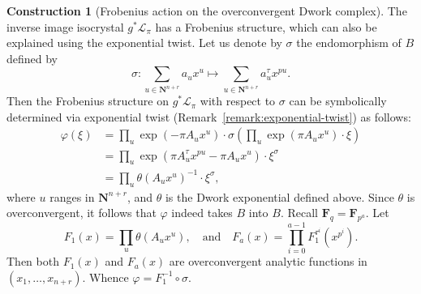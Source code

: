 \documentclass{amsart}
\numberwithin{equation}{section}
\theoremstyle{plain}
\theoremstyle{definition}
\newtheorem{construction}[equation]{Construction}
\renewcommand{\mathbb}{\mathbf}
\begin{document}
\begin{construction}[Frobenius action on the overconvergent Dwork complex]
\label{construction:frobenius}
The inverse image isocrystal \(g^{\ast}\mathcal{L}_{\pi}\) has a
Frobenius structure, which can also be explained using the exponential
twist.  Let us denote by \(\sigma\) the endomorphism of \(B\)
defined by
\begin{equation*}
\sigma\colon \sum_{u\in \mathbb{N}^{n+r}} a_{u} x^{u} \mapsto \sum_{u\in\mathbb{N}^{n+r}} a_{u}^{\tau} x^{pu}.
\end{equation*}
Then the Frobenius structure on \(g^{\ast}\mathcal{L}_{\pi}\) with
respect to \(\sigma\) can be symbolically determined via exponential twist
(Remark~\ref{remark:exponential-twist}) as follows:
\begin{align*}
  \varphi(\xi)
  &= \prod_{u} \exp(-\pi A_{u} x^{u}) \cdot \sigma\left( \prod_{u} \exp(\pi A_{u} x^{u}) \cdot \xi \right) \\
  &= \prod_{u} \exp(\pi A_{u}^{\tau} x^{pu} -\pi A_{u} x^{u} ) \cdot \xi^{\sigma} \\
  &= \prod_{u} \theta(A_{u} x^{u})^{-1} \cdot \xi^{\sigma},
\end{align*}
where \(u\) ranges in \(\mathbb{N}^{n+r}\), and \(\theta\) is the
Dwork exponential defined above.  Since \(\theta\) is overconvergent,
it follows that \(\varphi\) indeed takes \(B\) into \(B\).  Recall \(\mathbb{F}_{q} = \mathbb{F}_{p^{a}}\).
Let
\begin{equation}
\label{eq:frobenius-function}
F_{1}(x) = \prod_{u} \theta(A_{u}x^{u}), \quad \text{and} \quad F_{a}(x) = \prod_{i=0}^{a-1}F^{\tau^{i}}_{1}(x^{p^{i}}).
\end{equation}
Then both \(F_{1}(x)\) and \(F_{a}(x)\) are overconvergent analytic
functions in \((x_{1},\ldots,x_{n+r})\).  Whence
\(\varphi = F_{1}^{-1} \circ \sigma\).


\end{construction}
\end{document}
